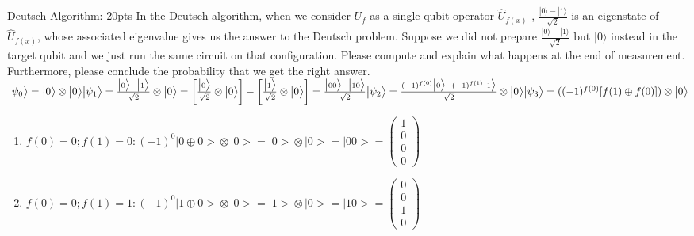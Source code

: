 \documentclass[12pt]{article}
\makeatletter
\newcommand{\<}{\langle}
\renewcommand{\>}{\rangle}
\newcommand{\kets}[1]{| #1 \rangle}                 %
\newenvironment{problem}{\@startsection
       {section}
       {1}
       {-.2em}
       {-3.5ex plus -1ex minus -.2ex}
       {2.3ex plus .2ex}
       {\pagebreak[3]
       \large\bf\noindent{Problem }
       }
       }
       {%
       \begin{center}\large\bf \end{center}}
\def\ket#1{\big|{#1}\big>}
\def\sqtwo{\sqrt{2}}
\makeatother
\begin{document}
\begin{problem}{Deutsch Algorithm: 20pts}
In the Deutsch algorithm, when we consider $U_f$ as a single-qubit operator ${\hat{U}}_{f(x)}$ , $\frac{\kets{0} - \kets{1}}{\sqrt{2}}$ is an eigenstate of  ${\hat{U}}_{f(x)}$, whose associated eigenvalue gives us the answer to the Deutsch problem. Suppose we did not prepare $\frac{\kets{0} - \kets{1}}{\sqrt{2}}$ but $\kets{0}$ instead in the target qubit and we just run the same circuit on that configuration. Please compute and explain what happens at the end of measurement. Furthermore, please conclude the probability that we get the right answer. \\
$
\ket{\psi_0} = \ket{0} \otimes \ket{0}\\
\ket{\psi_1} = \frac{\ket{0}-\ket{1}}{\sqrt{2}} \otimes \ket{0} = \left[ \frac{\ket{0}}{\sqrt{2}} \otimes \ket{0} \right] - \left[ \frac{\ket{1}}{\sqrt{2}} \otimes \ket{0} \right] = \frac{\ket{00}-\ket{10}}{\sqrt{2}} \\
\ket{\psi_2} = \frac{(-1)^{f(0)}\ket{0}-(-1)^{f(1)}\ket{1}}{\sqtwo} \otimes \ket{0}\\
\ket{\psi_3} = ((-1)^{f(0)}[f(1)\oplus f(0)]) \otimes \ket{0}\\
$
\vspace*{-.8cm}
\begin{enumerate}
\item $f(0) = 0 ; f(1) = 0 : (-1)^0\ket{0\oplus 0} \otimes \ket{0} = \ket{0} \otimes \ket{0}  = \ket{00} = \left(\begin{matrix}1\\0\\0\\0\end{matrix} \right)$
\item $f(0) = 0 ; f(1) = 1 : (-1)^0\ket{1\oplus 0} \otimes \ket{0} = \ket{1} \otimes \ket{0}  = \ket{10} = \left(\begin{matrix}0\\0\\1\\0\end{matrix} \right)$

\end{enumerate}
\end{problem}
\end{document}
